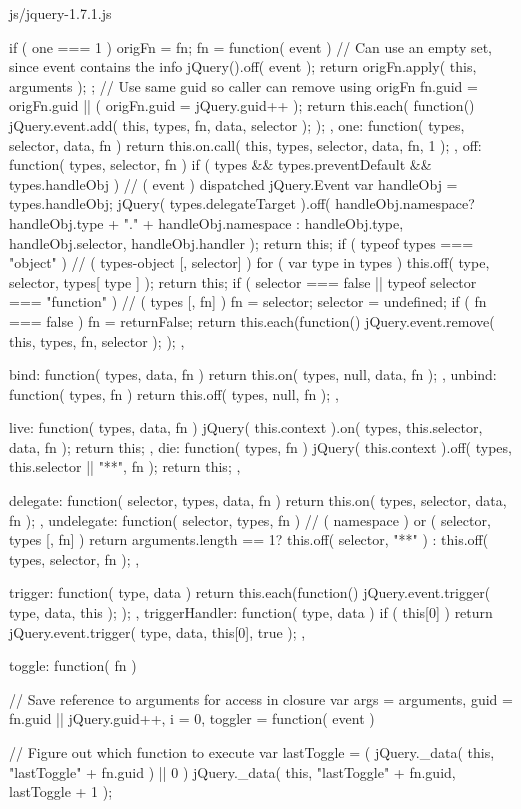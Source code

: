 \documentclass{article}
\begin{document}
\begin{chunk}{js/jquery-1.7.1.js}
{{{		if ( one === 1 ) {
			origFn = fn;
			fn = function( event ) {
				// Can use an empty set, since event contains the info
				jQuery().off( event );
				return origFn.apply( this, arguments );
			};
			// Use same guid so caller can remove using origFn
			fn.guid = origFn.guid || ( origFn.guid = jQuery.guid++ );
		}
		return this.each( function() {
			jQuery.event.add( this, types, fn, data, selector );
		});
	},
	one: function( types, selector, data, fn ) {
		return this.on.call( this, types, selector, data, fn, 1 );
	},
	off: function( types, selector, fn ) {
		if ( types && types.preventDefault && types.handleObj ) {
			// ( event )  dispatched jQuery.Event
			var handleObj = types.handleObj;
			jQuery( types.delegateTarget ).off(
				handleObj.namespace? handleObj.type + "." + handleObj.namespace : handleObj.type,
				handleObj.selector,
				handleObj.handler
			);
			return this;
		}
		if ( typeof types === "object" ) {
			// ( types-object [, selector] )
			for ( var type in types ) {
				this.off( type, selector, types[ type ] );
			}
			return this;
		}
		if ( selector === false || typeof selector === "function" ) {
			// ( types [, fn] )
			fn = selector;
			selector = undefined;
		}
		if ( fn === false ) {
			fn = returnFalse;
		}
		return this.each(function() {
			jQuery.event.remove( this, types, fn, selector );
		});
	},

	bind: function( types, data, fn ) {
		return this.on( types, null, data, fn );
	},
	unbind: function( types, fn ) {
		return this.off( types, null, fn );
	},

	live: function( types, data, fn ) {
		jQuery( this.context ).on( types, this.selector, data, fn );
		return this;
	},
	die: function( types, fn ) {
		jQuery( this.context ).off( types, this.selector || "**", fn );
		return this;
	},

	delegate: function( selector, types, data, fn ) {
		return this.on( types, selector, data, fn );
	},
	undelegate: function( selector, types, fn ) {
		// ( namespace ) or ( selector, types [, fn] )
		return arguments.length == 1? this.off( selector, "**" ) : this.off( types, selector, fn );
	},

	trigger: function( type, data ) {
		return this.each(function() {
			jQuery.event.trigger( type, data, this );
		});
	},
	triggerHandler: function( type, data ) {
		if ( this[0] ) {
			return jQuery.event.trigger( type, data, this[0], true );
		}
	},

	toggle: function( fn ) {
		// Save reference to arguments for access in closure
		var args = arguments,
			guid = fn.guid || jQuery.guid++,
			i = 0,
			toggler = function( event ) {
				// Figure out which function to execute
				var lastToggle = ( jQuery._data( this, "lastToggle" + fn.guid ) || 0 ) %
				jQuery._data( this, "lastToggle" + fn.guid, lastToggle + 1 );

}}}}
\end{chunk}
\end{document}
